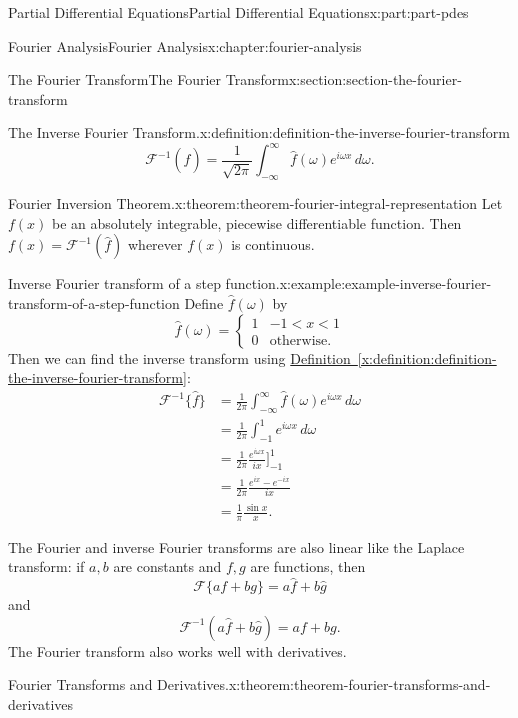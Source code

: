 \documentclass[twoside,10pt,]{book}
\newcommand{\xreffont}{\relax}
\numberwithin{equation}{part}
\newcommand{\amp}{&}
\begin{document}
\begin{partptx}{Partial Differential Equations}{}{Partial Differential Equations}{}{}{x:part:part-pdes}
\begin{chapterptx}{Fourier Analysis}{}{Fourier Analysis}{}{}{x:chapter:fourier-analysis}
\begin{sectionptx}{The Fourier Transform}{}{The Fourier Transform}{}{}{x:section:section-the-fourier-transform}
\begin{definition}{The Inverse Fourier Transform.}{x:definition:definition-the-inverse-fourier-transform}
\begin{equation*}
\mathcal{F}^{-1}(\hat{f}) = \frac{1}{\sqrt{2\pi}}\int_{-\infty}^{\infty}\hat{f}(\omega)e^{i\omega x}\,d\omega.
\end{equation*}
%
\end{definition}
\begin{theorem}{Fourier Inversion Theorem.}{}{x:theorem:theorem-fourier-integral-representation}%
%
Let \(f(x)\) be an absolutely integrable, piecewise differentiable function. Then \(f(x) = \mathcal{F}^{-1}(\hat{f})\) wherever \(f(x)\) is continuous.%
\end{theorem}
\begin{example}{Inverse Fourier transform of a step function.}{x:example:example-inverse-fourier-transform-of-a-step-function}%
Define \(\hat{f}(\omega)\) by%
\begin{equation*}
\hat{f}(\omega) = \begin{cases} 1 \amp -1 < x < 1 \\ 0 \amp \text{otherwise.}\end{cases}
\end{equation*}
Then we can find the inverse transform using \hyperref[x:definition:definition-the-inverse-fourier-transform]{Definition~{\xreffont\ref{x:definition:definition-the-inverse-fourier-transform}}}:%
\begin{align*}
\mathcal{F}^{-1}\{\hat{f}\} \amp = \frac{1}{2\pi}\int_{-\infty}^{\infty}\hat{f}(\omega)e^{i\omega x}\,d\omega \\
\amp = \frac{1}{2\pi}\int_{-1}^{1}e^{i\omega x}\,d\omega \\
\amp = \frac{1}{2\pi}\frac{e^{i\omega x}}{ix}\Big]_{-1}^{1} \\
\amp = \frac{1}{2\pi}\frac{e^{ix}-e^{-ix}}{ix} \\
\amp = \frac{1}{\pi}\frac{\sin x}{x}. 
\end{align*}
%
\end{example}
The Fourier and inverse Fourier transforms are also linear like the Laplace transform: if \(a,b\) are constants and \(f,g\) are functions, then%
\begin{equation*}
\mathcal{F}\{af+bg\} = a\hat{f}+b\hat{g}
\end{equation*}
and%
\begin{equation*}
\mathcal{F}^{-1}(a\hat{f}+b\hat{g}) = af + bg.
\end{equation*}
The Fourier transform also works well with derivatives.%
\begin{theorem}{Fourier Transforms and Derivatives.}{}{x:theorem:theorem-fourier-transforms-and-derivatives}%

\end{theorem}
\end{sectionptx}
\end{chapterptx}
\end{partptx}
\end{document}
